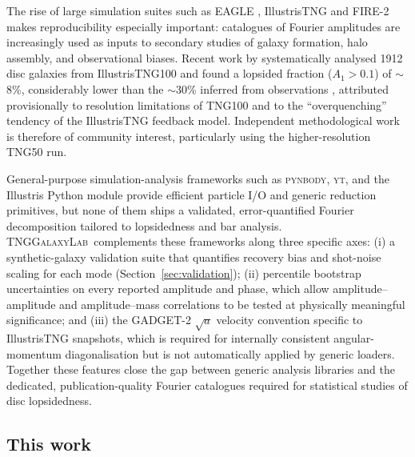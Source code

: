 \documentclass[fleqn,usenatbib]{mnras}
\newcommand{\Am}[1]{A_{#1}}
\newcommand{\Amone}{\ensuremath{\Am{1}}}
\newcommand{\pipeline}{\textsc{TNGGalaxyLab}}
\begin{document}
The rise of large simulation suites such as EAGLE
\citep{2015MNRAS.446..521S}, IllustrisTNG \citep{2019ComAC...6....2N} and
FIRE-2 \citep{2018MNRAS.480..800H} makes reproducibility especially
important: catalogues of Fourier amplitudes are increasingly used
as inputs to secondary studies of galaxy formation, halo assembly,
and observational biases.  Recent work by
\citet{2022A&A...662A..53L} systematically analysed 1912 disc galaxies from
IllustrisTNG100 and found a lopsided fraction ($\Amone > 0.1$) of
$\sim$8\%, considerably lower than the $\sim$30\% inferred from
observations \citep{2009PhR...471...75J}, attributed provisionally to
resolution limitations of TNG100 and to the ``overquenching''
tendency of the IllustrisTNG feedback model.  Independent
methodological work is therefore of community interest, particularly
using the higher-resolution TNG50 run.

General-purpose simulation-analysis frameworks such as \textsc{pynbody},
\textsc{yt}, and the Illustris Python module provide efficient particle
I/O and generic reduction primitives, but none of them ships a
validated, error-quantified Fourier decomposition tailored to
lopsidedness and bar analysis.  \pipeline\ complements these
frameworks along three specific axes: (i) a synthetic-galaxy
validation suite that quantifies recovery bias and shot-noise
scaling for each mode (Section~\ref{sec:validation}); (ii) percentile
bootstrap uncertainties on every reported amplitude and phase, which
allow amplitude--amplitude and amplitude--mass correlations to be
tested at physically meaningful significance; and (iii) the
GADGET-2 $\sqrt{a}$ velocity convention specific to IllustrisTNG
snapshots, which is required for internally consistent angular-momentum
diagonalisation but is not automatically applied by generic loaders.
Together these features close the gap between generic analysis
libraries and the dedicated, publication-quality Fourier
catalogues required for statistical studies of disc lopsidedness.

\subsection{This work}
\end{document}
